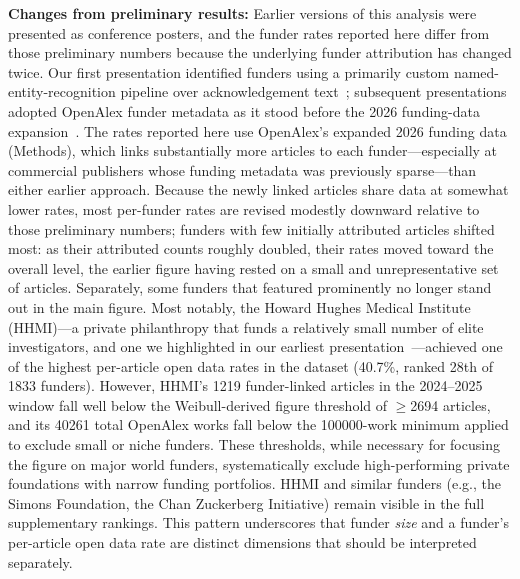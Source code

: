 \textbf{Changes from preliminary results:} Earlier versions of this analysis were presented as conference posters, and the funder rates reported here differ from those preliminary numbers because the underlying funder attribution has changed twice. Our first presentation identified funders using a primarily custom named-entity-recognition pipeline over acknowledgement text~\cite{Thomas2025-fr}; subsequent presentations adopted OpenAlex funder metadata as it stood before the 2026 funding-data expansion~\cite{Lawrimore2026-ly,Lawrimore2026-xq}. The rates reported here use OpenAlex's expanded 2026 funding data (Methods), which links substantially more articles to each funder---especially at commercial publishers whose funding metadata was previously sparse---than either earlier approach. Because the newly linked articles share data at somewhat lower rates, most per-funder rates are revised modestly downward relative to those preliminary numbers; funders with few initially attributed articles shifted most: as their attributed counts roughly doubled, their rates moved toward the overall level, the earlier figure having rested on a small and unrepresentative set of articles. Separately, some funders that featured prominently no longer stand out in the main figure. Most notably, the Howard Hughes Medical Institute (HHMI)---a private philanthropy that funds a relatively small number of elite investigators, and one we highlighted in our earliest presentation~\cite{Thomas2025-fr}---achieved one of the highest per-article open data rates in the dataset (40.7\%, ranked 28th of \num{1833} funders). However, HHMI's \num{1219} funder-linked articles in the 2024--2025 window fall well below the Weibull-derived figure threshold of $\geq$\num{2694} articles, and its \num{40261} total OpenAlex works fall below the \num{100000}-work minimum applied to exclude small or niche funders. These thresholds, while necessary for focusing the figure on major world funders, systematically exclude high-performing private foundations with narrow funding portfolios. HHMI and similar funders (e.g., the Simons Foundation, the Chan Zuckerberg Initiative) remain visible in the full supplementary rankings. This pattern underscores that funder \emph{size} and a funder's per-article open data rate are distinct dimensions that should be interpreted separately.

